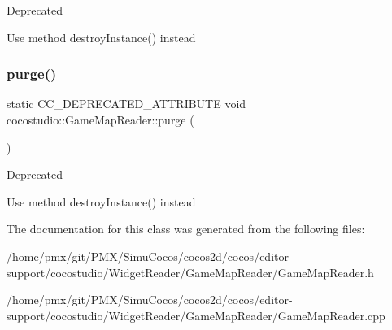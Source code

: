 \begin{DoxyRefDesc}{Deprecated}
\item[\hyperlink{deprecated__deprecated000087}{Deprecated}]Use method destroy\+Instance() instead \end{DoxyRefDesc}
\mbox{\label{classcocostudio_1_1GameMapReader_ad240192e277b51042d9a9788ac19c3c8}} 
\subsubsection{\texorpdfstring{purge()}{purge()}\hspace{0.1cm}{\footnotesize\ttfamily [2/2]}}
{\footnotesize\ttfamily static C\+C\+\_\+\+D\+E\+P\+R\+E\+C\+A\+T\+E\+D\+\_\+\+A\+T\+T\+R\+I\+B\+U\+TE void cocostudio\+::\+Game\+Map\+Reader\+::purge (\begin{DoxyParamCaption}{ }\end{DoxyParamCaption})\hspace{0.3cm}{\ttfamily [static]}}

\begin{DoxyRefDesc}{Deprecated}
\item[\hyperlink{deprecated__deprecated000322}{Deprecated}]Use method destroy\+Instance() instead \end{DoxyRefDesc}


The documentation for this class was generated from the following files\+:\begin{DoxyCompactItemize}
\item 
/home/pmx/git/\+P\+M\+X/\+Simu\+Cocos/cocos2d/cocos/editor-\/support/cocostudio/\+Widget\+Reader/\+Game\+Map\+Reader/Game\+Map\+Reader.\+h\item 
/home/pmx/git/\+P\+M\+X/\+Simu\+Cocos/cocos2d/cocos/editor-\/support/cocostudio/\+Widget\+Reader/\+Game\+Map\+Reader/Game\+Map\+Reader.\+cpp\end{DoxyCompactItemize}
